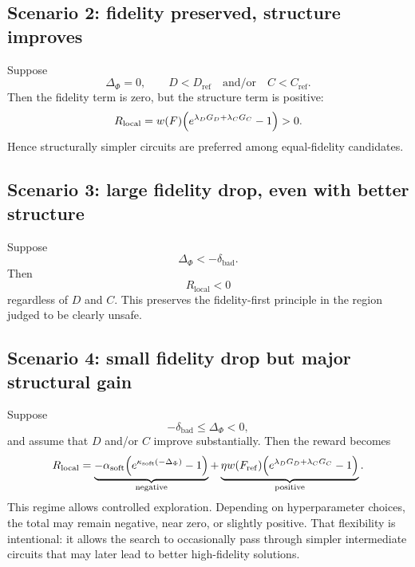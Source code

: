 \documentclass[11pt]{article}
\begin{document}
\subsection{Scenario 2: fidelity preserved, structure improves}

Suppose
\begin{equation}
    \Delta_{\Phi}=0,
    \qquad
    D<D_{\mathrm{ref}}
    \quad\text{and/or}\quad
    C<C_{\mathrm{ref}}.
\end{equation}
Then the fidelity term is zero, but the structure term is positive:
\begin{equation}
    R_{\mathrm{local}}=w(F)\Bigl(e^{\lambda_D G_D+\lambda_C G_C}-1\Bigr)>0.
\end{equation}
Hence structurally simpler circuits are preferred among equal-fidelity candidates.

\subsection{Scenario 3: large fidelity drop, even with better structure}

Suppose
\begin{equation}
    \Delta_{\Phi}< -\delta_{\mathrm{bad}}.
\end{equation}
Then
\begin{equation}
    R_{\mathrm{local}}<0
\end{equation}
regardless of $D$ and $C$.
This preserves the fidelity-first principle in the region judged to be clearly unsafe.

\subsection{Scenario 4: small fidelity drop but major structural gain}

Suppose
\begin{equation}
    -\delta_{\mathrm{bad}}\le \Delta_{\Phi}<0,
\end{equation}
and assume that $D$ and/or $C$ improve substantially.
Then the reward becomes
\begin{equation}
    R_{\mathrm{local}}=
    \underbrace{-\alpha_{\mathrm{soft}}\Bigl(e^{\kappa_{\mathrm{soft}}(-\Delta_{\Phi})}-1\Bigr)}_{\text{negative}}
    +
    \underbrace{\eta w(F_{\mathrm{ref}})\Bigl(e^{\lambda_D G_D+\lambda_C G_C}-1\Bigr)}_{\text{positive}}.
\end{equation}
This regime allows controlled exploration.
Depending on hyperparameter choices, the total may remain negative, near zero, or slightly positive.
That flexibility is intentional: it allows the search to occasionally pass through simpler intermediate circuits that may later lead to better high-fidelity solutions.
\end{document}
